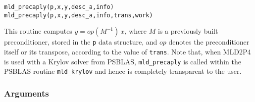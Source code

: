 \begin{center}
\verb|mld_precaply(p,x,y,desc_a,info)|\\
\verb|mld_precaply(p,x,y,desc_a,info,trans,work)|\\
\end{center}

\noindent
This routine computes $y = op(M^{-1})\, x$, where $M$ is a previously built
preconditioner, stored in the \verb|p| data structure, and $op$
denotes the preconditioner itself or its transpose, according to
the value of \verb|trans|.
Note that, when MLD2P4 is used with a Krylov solver from PSBLAS,
\verb|mld_precaply| is called within the PSBLAS routine \verb|mld_krylov|
and hence is completely transparent to the user.

\subsubsection*{Arguments}

